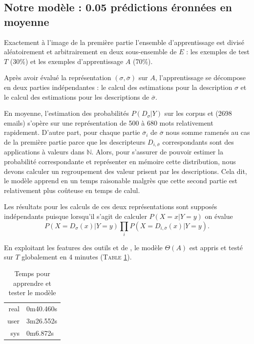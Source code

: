 \documentclass[a4paper, french]{article}
\begin{document}
\subsection{Notre mod\`ele : 0.05 pr\'edictions \'eronn\'ees en moyenne}

Exactement \`a l'image de la premi\`ere partie l'ensemble d'apprentissage
est divis\'e al\'eatoirement et arbitrairement en deux sous-ensemble de $E$ :
les exemples de test $T$ (30\%) et les exemples d'apprentissage $A$ (70\%).

Apr\`es avoir \'evalu\'e la repr\'esentation
$\left(\sigma,\overline\sigma\right)$ sur $A$, l'apprentissage se d\'ecompose
en deux parties ind\'ependantes :
le calcul des estimations pour la description $\sigma$ et
le calcul des estimations pour les descriptions de $\overline\sigma$.

En moyenne, l'estimation des probabilit\'es $P(D_{\sigma}|Y)$ sur les
corpus  et  (2698 emails) s'op\`ere sur une
repr\'esentation de 500 \`a 680 mots relativement rapidement. D'autre
part, pour chaque partie $\overline\sigma_i$ de $\overline\sigma$ nous
somme ramen\'es au cas de la premi\`ere partie parce que les descripteurs
$D_{i,\overline\sigma}$ correspondants sont des applications \`a valeurs dans
$\mathbb{N}$. Alors, pour s'assurer de pouvoir estimer la probabilit\'e
correspondante et repr\'esenter en m\'emoire cette distribution, nous
devons calculer un regroupement des valeur prisent par les descriptions.
Cela dit, le mod\`ele apprend en un temps raisonable malgr\`es que cette
second partie est relativement plus co\^uteuse en temps de calul.

Les r\'esultats pour les calculs de ces deux repr\'esentations sont suppos\'es
ind\'ependants puisque lorsqu'il s'agit de calculer $P(X=x|Y=y)$ on \'evalue
\begin{equation}
  P(X=D_\sigma(x)|Y=y)\prod_{i} P(X=D_{i,\overline\sigma}(x)|Y=y).
\end{equation}

En exploitant les features des outils  et
 de , le mod\`ele $\Theta(A)$
est appris et test\'e sur $T$ globalement en 4 minutes (T\textsc{able}
\ref{tbl:time_modeleplus}).

\begin{table}[h]
\begin{center}
  \caption{Temps pour apprendre et tester le mod\`ele}
  \vskip 4mm
  \begin{tabular}{rl}
    real    &0m40.460s\\
    user    &3m26.552s\\
    sys     &0m6.872s
  \end{tabular}
  \label{tbl:time_modeleplus}
\end{center}
\end{table}
\end{document}
